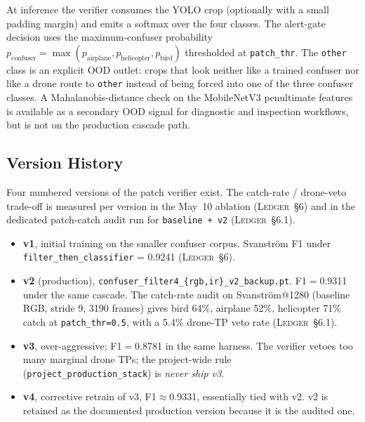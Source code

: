 \documentclass[12pt,a4paper,oneside,openright]{book}
\begin{document}
At inference the verifier consumes the YOLO crop (optionally with a small padding margin) and emits a softmax over the four classes. The alert-gate decision uses the maximum-confuser probability $p_\text{confuser} = \max(p_\text{airplane}, p_\text{helicopter}, p_\text{bird})$ thresholded at \texttt{patch\_thr}. The \texttt{other} class is an explicit OOD outlet: crops that look neither like a trained confuser nor like a drone route to \texttt{other} instead of being forced into one of the three confuser classes. A Mahalanobis-distance check on the MobileNetV3 penultimate features is available as a secondary OOD signal for diagnostic and inspection workflows, but is not on the production cascade path.

\subsection{Version History}

Four numbered versions of the patch verifier exist. The catch-rate / drone-veto trade-off is measured per version in the May~10 ablation (\textsc{Ledger}~\S6) and in the dedicated patch-catch audit run for \texttt{baseline + v2} (\textsc{Ledger}~\S6.1).

\begin{itemize}
    \item \textbf{v1}, initial training on the smaller confuser corpus. Svanstr\"om F1 under \texttt{filter\_then\_classifier} = 0.9241 (\textsc{Ledger}~\S6).
    \item \textbf{v2} (production), \texttt{confuser\_filter4\_\{rgb,ir\}\_v2\_backup.pt}. F1$=$0.9311 under the same cascade. The catch-rate audit on Svanstr\"om@1280 (baseline RGB, stride 9, 3190 frames) gives bird 64\%, airplane 52\%, helicopter 71\% catch at \texttt{patch\_thr=0.5}, with a 5.4\% drone-TP veto rate (\textsc{Ledger}~\S6.1).
    \item \textbf{v3}, over-aggressive; F1$=$0.8781 in the same harness. The verifier vetoes too many marginal drone TPs; the project-wide rule (\texttt{project\_production\_stack}) is \emph{never ship v3}.
    \item \textbf{v4}, corrective retrain of v3, F1$\approx$0.9331, essentially tied with v2. v2 is retained as the documented production version because it is the audited one.
\end{itemize}
\end{document}
